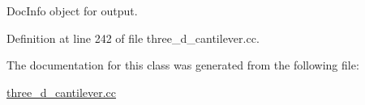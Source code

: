 Doc\+Info object for output. 



Definition at line 242 of file three\+\_\+d\+\_\+cantilever.\+cc.



The documentation for this class was generated from the following file\+:\begin{DoxyCompactItemize}
\item 
\hyperlink{three__d__cantilever_8cc}{three\+\_\+d\+\_\+cantilever.\+cc}\end{DoxyCompactItemize}
